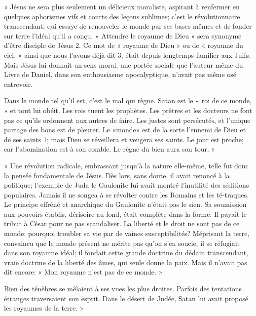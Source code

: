 \documentclass{article}
\begin{document}
\begin{center}« Jésus ne sera plus seulement un délicieux moraliste, aspirant à renfermer en quelques aphorismes vifs et courts des leçons sublimes; c'est le révolutionnaire transcendant, qui essaye de renouveler le monde par ses bases mêmes et de fonder sur terre l'idéal qu'il a conçu. « Attendre le royaume de Dieu » sera synonyme d'être disciple de Jésus 2. Ce mot de « royaume de Dieu » ou de « royaume du ciel, » ainsi que nous l'avons déjà dit 3, était depuis longtemps familier aux Juifs. Mais Jésus lui donnait un sens moral, une portée sociale que l'auteur même du Livre de Daniel, dans son enthousiasme apocalyptique, n'avait pas même osé entrevoir.

Dans le monde tel qu'il est, c'est le mal qui règne. Satan est le « roi de ce monde, » et tout lui obéit. Les rois tuent les prophètes. Les prêtres et les docteurs ne font pas ce qu'ils ordonnent aux autres de faire. Les justes sont persécutés, et l'unique partage des bons est de pleurer. Le «monde» est de la sorte l'ennemi de Dieu et de ses saints 1; mais Dieu se réveillera et vengera ses saints. Le jour est proche; car l'abomination est à son comble. Le règne du bien aura son tour. »
\end{center}

\begin{center}« Une révolution radicale, embrassant jusqu'à la nature elle-même, telle fut donc la pensée fondamentale de Jésus. Dès lors, sans doute, il avait renoncé à la politique; l'exemple de Juda le Gaulonite lui avait montré l'inutilité des séditions populaires. Jamais il ne songea à se révolter contre les Romains et les té-traques. Le principe effréné et anarchique du Gaulonite n'était pas le sien. Sa soumission aux pouvoirs établis, dérisoire au fond, était complète dans la forme. Il payait le tribut à César pour ne pas scandaliser. La liberté et le droit ne sont pas de ce monde; pourquoi troubler sa vie par de vaines susceptibilités?
Méprisant la terre, convaincu que le monde présent ne mérite pas qu'on s'en soucie, il se réfugiait dans son royaume idéal; il fondait cette grande doctrine du dédain transcendant, vraie doctrine de la liberté des âmes, qui seule donne la paix. Mais il n'avait pas dit encore: « Mon royaume n'est pas de ce monde. »

Bien des ténèbres se mêlaient à ses vues les plus droites. Parfois des tentations étranges traversaient son esprit. Dans le désert de Judée, Satan lui avait proposé les royaumes de la terre. »\end{center}
\end{document}
